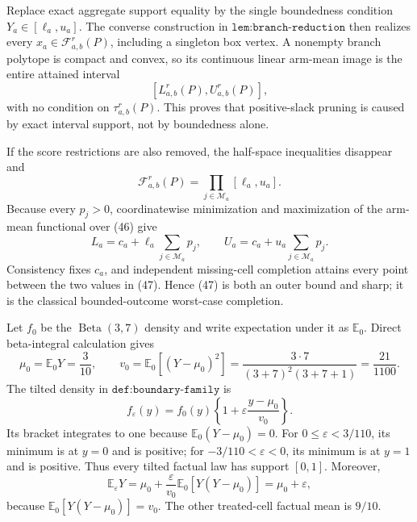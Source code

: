 Replace exact aggregate support equality by the single boundedness condition \(Y_a\in[\ell_a,u_a]\).  The converse construction in \(\texttt{lem:branch-reduction}\) then realizes every \(x_a\in\mathcal F_{a,b}^r(P)\), including a singleton box vertex.  A nonempty branch polytope is compact and convex, so its continuous linear arm-mean image is the entire attained interval
\[
 [L_{a,b}^r(P),U_{a,b}^r(P)],                                                  \tag{45}
\]
with no condition on \(\tau_{a,b}^r(P)\).  This proves that positive-slack pruning is caused by exact interval support, not by boundedness alone.

If the score restrictions are also removed, the half-space inequalities disappear and
\[
 \mathcal F_{a,b}^r(P)=\prod_{j\in\mathcal M_a}[\ell_a,u_a].                  \tag{46}
\]
Because every \(p_j>0\), coordinatewise minimization and maximization of the arm-mean functional over (46) give
\[
 L_a=c_a+\ell_a\sum_{j\in\mathcal M_a}p_j,
 \qquad
 U_a=c_a+u_a\sum_{j\in\mathcal M_a}p_j.                                     \tag{47}
\]
Consistency fixes \(c_a\), and independent missing-cell completion attains every point between the two values in (47).  Hence (47) is both an outer bound and sharp; it is the classical bounded-outcome worst-case completion.

Let \(f_0\) be the \(\operatorname{Beta}(3,7)\) density and write expectation under it as \(\mathbb E_0\).  Direct beta-integral calculation gives
\[
 \mu_0=\mathbb E_0Y=\frac3{10},\qquad
 v_0=\mathbb E_0[(Y-\mu_0)^2]
 =\frac{3\cdot7}{(3+7)^2(3+7+1)}=\frac{21}{1100}.                            \tag{48}
\]
The tilted density in \(\texttt{def:boundary-family}\) is
\[
 f_\varepsilon(y)=f_0(y)\left\{1+\varepsilon\frac{y-\mu_0}{v_0}\right\}.
\]
Its bracket integrates to one because \(\mathbb E_0(Y-\mu_0)=0\).  For \(0\le\varepsilon<3/110\), its minimum is at \(y=0\) and is positive; for \(-3/110<\varepsilon<0\), its minimum is at \(y=1\) and is positive.  Thus every tilted factual law has support \([0,1]\).  Moreover,
\[
 \mathbb E_\varepsilon Y
 =\mu_0+\frac{\varepsilon}{v_0}\mathbb E_0[Y(Y-\mu_0)]
 =\mu_0+\varepsilon,                                                         \tag{49}
\]
because \(\mathbb E_0[Y(Y-\mu_0)]=v_0\).  The other treated-cell factual mean is \(9/10\).

